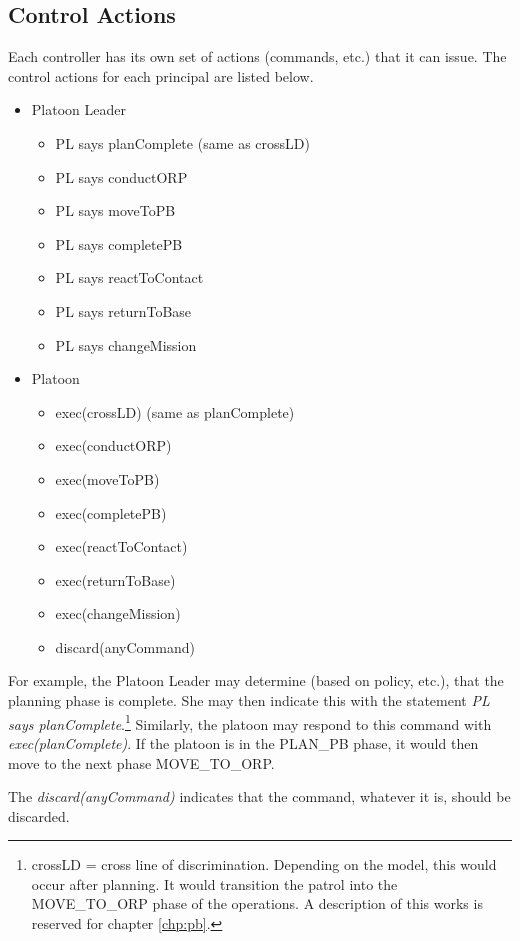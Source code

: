 \documentclass[../../main/main.tex]{subfiles}
\begin{document}
\subsection{Control Actions}
Each controller has its own set of actions (commands, etc.) that it can issue.  The control actions for each principal are listed below.  
\begin{itemize}
\item Platoon Leader
\begin{itemize}
\item PL says planComplete (same as crossLD)
\item PL says conductORP
\item PL says moveToPB
\item PL says completePB
\item PL says reactToContact
\item PL says returnToBase
\item PL says changeMission
\end{itemize}
\item Platoon
\begin{itemize}
\item exec(crossLD) (same as planComplete)
\item exec(conductORP)
\item exec(moveToPB)
\item exec(completePB)
\item exec(reactToContact)
\item exec(returnToBase)
\item exec(changeMission)
\item discard(anyCommand)
\end{itemize}

\end{itemize}

For example, the Platoon Leader may determine (based on policy, etc.), that the planning phase is complete.  She may then indicate this with the statement \textit{PL says planComplete}.\footnote{crossLD = cross line of discrimination.  Depending on the model, this would occur after planning.  It would transition the patrol into the MOVE_TO_ORP phase of the operations.  A description of this works is reserved for chapter \ref{chp:pb}.} Similarly, the platoon may respond to this command with \textit{exec(planComplete)}.  If the platoon is in the PLAN_PB phase, it would then move to the next phase MOVE_TO_ORP.

The \textit{discard(anyCommand)} indicates that the command, whatever it is, should be discarded. 
\end{document}
